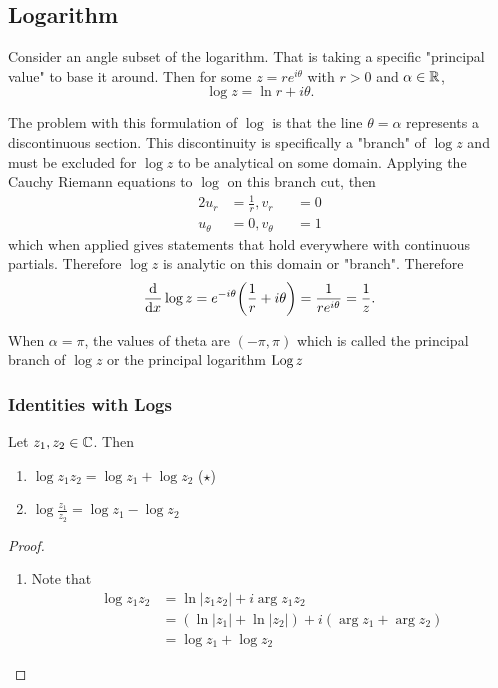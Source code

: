 \documentclass[../notes.tex]{subfiles}
\begin{document}

\subsection{Logarithm}

Consider an angle subset of the logarithm. That is taking a specific "principal value" to base it around. Then for some $z = re^{i \theta}$ with $r > 0$ and $\alpha \in \mathbb{R}$,
\[
    \log z = \ln r + i \theta \tag{$\theta \in (a, \alpha + 2 \pi)$}
.\]

The problem with this formulation of $\log$ is that the line $\theta = \alpha$ represents a discontinuous section. This discontinuity is specifically a "branch" of $\log z$ and must be excluded for $\log z$ to be analytical on some domain. Applying the Cauchy Riemann equations to $\log$ on this branch cut, then
\begin{alignat*}{2}
    u_r &= \frac{1}{r}, v_r &&= 0 \\
    u_\theta &= 0, v_{\theta} &&= 1
\end{alignat*}
which when applied gives statements that hold everywhere with continuous partials. Therefore $\log z$ is analytic on this domain or "branch". Therefore
\[
    \dv{x} \log z = e^{-i \theta} \qty(\frac{1}{r} + i \theta) = \frac{1}{re^{i \theta}}= \frac{1}{z}
.\]

\begin{remark}
    When $\alpha = \pi$, the values of theta are $(-\pi, \pi)$ which is called the principal branch of $\log z$ or the principal logarithm $\operatorname{Log} z$
\end{remark}

\subsubsection{Identities with Logs}

\begin{theorem}
    Let $z_1, z_2 \in \mathbb{C}$. Then
    \begin{enumerate}
        \item $\log z_1 z_2 = \log z_1 + \log z_2$ \hfill ($\star$)
        \item $\log \frac{z_1}{z_2} = \log z_1 - \log z_2$
    \end{enumerate}
\end{theorem}

\begin{proof}
    \hfill\begin{enumerate}
        \item Note that
            \begin{align*}
                \log z_1 z_2 &= \ln |z_1 z_2| + i \arg z_1 z_2 \\
                &= (\ln |z_1| + \ln|z_2|) + i(\arg z_1 + \arg z_2) \\
                &= \log z_1 + \log z_2
            \end{align*}
    \end{enumerate}
\end{proof}
\end{document}
